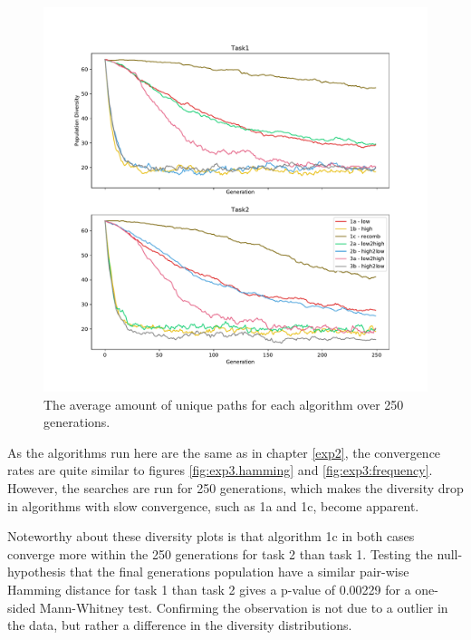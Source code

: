 \begin{figure}[h!]
    \includegraphics[width=\textwidth, center]{Chapters/4.Experiments/exp3/figures/diversity_frequency.pdf}
    \caption[Frequency diversity plot]{The average amount of unique paths for each algorithm over 250 generations.}
    \label{fig:exp3.frequency}
\end{figure}

As the algorithms run here are the same as in chapter \ref{exp2}, the convergence rates are quite similar to figures \ref{fig:exp3.hamming} and \ref{fig:exp3:frequency}. However, the searches are run for 250 generations, which makes the diversity drop in algorithms with slow convergence, such as 1a and 1c, become apparent. 

Noteworthy about these diversity plots is that algorithm 1c in both cases converge more within the 250 generations for task 2 than task 1. Testing the null-hypothesis that the final generations population have a similar pair-wise Hamming distance for task 1 than task 2 gives a p-value of 0.00229 for a one-sided Mann-Whitney test. Confirming the observation is not due to a outlier in the data, but rather a difference in the diversity distributions. 

